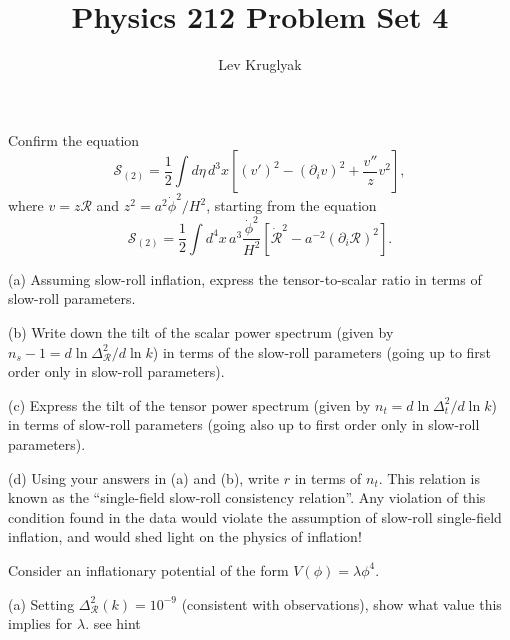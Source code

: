 \documentclass{lkx_pset}
\title{Physics 212 Problem Set 4}
\author{Lev Kruglyak}
\begin{document}
\maketitle

\begin{problem}{1}
  Confirm the equation
  \[
    \mathcal{S}_{(2)} = \frac{1}{2}\int d\eta\,d^3x\left[ (v')^2-(\partial_i v)^2 + \frac{v''}{z}v^2\right],
  \]
  where $v=z\mathcal{R}$ and $z^2=a^2\dot{\phi}^2/H^2$, starting from the equation
  \[
    \mathcal{S}_{(2)} = \frac{1}{2}\int d^4 x\, a^3\frac{\dot{\phi}^2}{H^2}\left[\dot{\mathcal{R}}^2 - a^{-2}(\partial_i \mathcal{R})^2\right].
  \]
\end{problem}

\begin{problem}{2}
\end{problem}
\begin{parts}
  \begin{part}{(a)}
  Assuming slow-roll inflation, express the tensor-to-scalar ratio in terms of slow-roll parameters.
  \end{part}

  \begin{part}{(b)}
    Write down the tilt of the scalar power spectrum (given by $n_s-1=d\ln \Delta_{\mathcal{R}}^2/d\ln k$) in terms of the slow-roll parameters (going up to first order only in slow-roll parameters).
  \end{part}

  \begin{part}{(c)}
    Express the tilt of the tensor power spectrum (given by $n_t = d\ln\Delta_t^2/d\ln k$) in terms of slow-roll parameters (going also up to first order only in slow-roll parameters). 
  \end{part}

  \begin{part}{(d)}
    Using your answers in (a) and (b), write $r$ in terms of $n_t$. This relation is known as the ``single-field slow-roll consistency relation''. Any violation of this condition found in the data would violate the assumption of slow-roll single-field inflation, and would shed light on the physics of inflation!
  \end{part}
\end{parts}

\begin{problem}{3}
  Consider an inflationary potential of the form $V(\phi)=\lambda\phi^4$.
\end{problem}
\begin{parts}
  \begin{part}{(a)}
    Setting $\Delta_{\mathcal{R}}^2(k)=10^{-9}$ (consistent with observations), show what value this implies for $\lambda$. {\color{blue} see hint}
  \end{part}
\end{parts}
\end{document}
